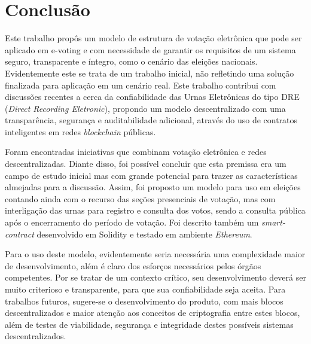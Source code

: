 \documentclass[portuguese]{textolivre}
\begin{document}
	\section{Conclusão \label{conclusao}}
	
	
	Este trabalho propôs um modelo de estrutura de votação eletrônica que pode ser aplicado em e-voting e com necessidade de garantir os requisitos de um sistema seguro, transparente e íntegro, como o cenário das eleições nacionais. Evidentemente este se trata de um trabalho inicial, não refletindo uma solução finalizada para aplicação  em um cenário real. Este trabalho contribui com discussões recentes a cerca da confiabilidade das Urnas Eletrônicas do tipo DRE (\textit{Direct Recording Eletronic}), propondo um modelo descentralizado com uma transparência, segurança e auditabilidade adicional, através do uso de contratos inteligentes em redes \textit{blockchain} públicas.
	
	
	Foram encontradas iniciativas que combinam votação eletrônica e redes descentralizadas. Diante disso, foi possível concluir que esta premissa era um campo de estudo inicial mas com grande potencial para trazer as características almejadas para a discussão. Assim, foi proposto um modelo para uso em eleições contando ainda com o recurso das seções presenciais de votação, mas com interligação das urnas para registro e consulta dos votos, sendo a consulta pública após o encerramento do período de votação. Foi descrito também um \textit{smart-contract} desenvolvido em Solidity e testado em ambiente \textit{Ethereum}.
	
	Para o uso deste modelo, evidentemente seria necessária uma complexidade maior de desenvolvimento, além é claro dos esforços necessários pelos órgãos competentes. Por se tratar de um contexto crítico, seu desenvolvimento deverá ser muito criterioso e transparente, para que sua confiabilidade seja aceita. %
	Para trabalhos futuros, sugere-se o desenvolvimento do produto, com mais blocos descentralizados e maior atenção aos conceitos de criptografia entre estes blocos, além de testes de viabilidade, segurança e integridade destes possíveis sistemas descentralizados.
	
\end{document}
